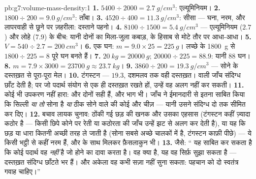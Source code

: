 \begin{solution}{pb:g7:volume-mass-density:1}
\textbf{1.} $5400 \div 2000 = \qty{2.7}{g/cm^3}$: एल्यूमिनियम।
\textbf{2.} $1800 \div 200 = \qty{9.0}{g/cm^3}$: ताँबा।
\textbf{3.} $4520 \div 400 = \qty{11.3}{g/cm^3}$: सीसा --- घना,
नरम, और लापरवाही से छूने पर ज़हरीला: दस्ताने पहनो।
\textbf{4.} $8100 \div 1500 = \qty{5.4}{g/cm^3}$ --- एल्यूमिनियम
($2.7$) और लोहे ($7.9$) के बीच: यानी दोनों का मिला-जुला कबाड़,
 के हिसाब से मोटे तौर पर आधा-आधा।
\textbf{5.} $V = 540 \div 2.7 = \qty{200}{cm^3}$।
\textbf{6.} एक घन: $m = 9.0 \times 25 = \qty{225}{g}$। लच्छे के
\qty{1800}{g} से $1800 \div 225 = 8$ पूरे घन बनते हैं।
\textbf{7.} $\qty{20}{kg} = \qty{20000}{g}$; $20000 \div 225 =
88.9$: यानी $88$ घन।
\textbf{8.} $m = 7.9 \times 3000 = \qty{23700}{g} \approx
\qty{23.7}{kg}$।
\textbf{9.} $3860 \div 200 = \qty{19.3}{g/cm^3}$ --- सोने के
दस्तख़त से पूरा-पूरा मेल।
\textbf{10.} टंगस्टन ---  $19.3$, दशमलव तक वही दस्तख़त। 
वाली जाँच संदिग्ध छाँट देती है; पर जो पदार्थ संयोग से एक ही दस्तख़त
रखते हों, उन्हें वह अलग नहीं कर सकती।
\textbf{11.} कोई भी उपकरण नहीं हारा:  और  दोनों सही हैं,
और भाग भी। जाँच ने ईमानदारी से इतना साबित किया कि सिल्ली \emph{या तो}
सोना है \emph{या} ठीक सोने वाले  की कोई और चीज़ --- यानी उसने
संदिग्ध दो तक सीमित कर दिए।
\textbf{12.} बचाव लायक चुनाव: ठोंकी गई छड़ की खनक और उसका एहसास
(टंगस्टन कहीं ज़्यादा कठोर है --- किसी छिपे कोने पर रेती या कठोरता की
जाँच उन्हें झट से अलग कर देती है), या यह  कि छड़  या धारा
कितनी अच्छी तरह ले जाती है (सोना सबसे अच्छे चालकों में है, टंगस्टन
काफ़ी पीछे) --- ये किसी भट्ठी से कहीं नरम हैं, और  के साथ मिलकर
फ़ैसलाकुन भी।
\textbf{13.} जैसे: `` यह साबित कर सकता है कि कोई पदार्थ वह
\emph{नहीं} है जो होने का दावा करता है। वह क्या है, यह वह सिर्फ़ सुझा
सकता है --- दस्तख़त संदिग्ध छाँटते भर हैं। और अकेला वह कभी सज़ा नहीं
सुना सकता: पहचान को दो स्वतंत्र गवाह चाहिए।''
\end{solution}
